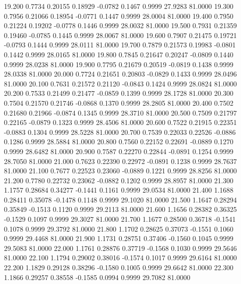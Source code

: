   19.200   0.7734   0.20155   0.18929  -0.0782   0.1467   0.9999  27.9283  81.0000
  19.300   0.7956   0.21066   0.18954  -0.0771   0.1447   0.9999  28.0004  81.0000
  19.400   0.7950   0.21224   0.19202  -0.0778   0.1446   0.9999  28.0032  81.0000
  19.500   0.7931   0.21359   0.19460  -0.0785   0.1445   0.9999  28.0067  81.0000
  19.600   0.7907   0.21475   0.19721  -0.0793   0.1444   0.9999  28.0111  81.0000
  19.700   0.7879   0.21573   0.19983  -0.0801   0.1442   0.9999  28.0165  81.0000
  19.800   0.7845   0.21647   0.20247  -0.0809   0.1440   0.9999  28.0238  81.0000
  19.900   0.7795   0.21679   0.20519  -0.0819   0.1438   0.9999  28.0338  81.0000
  20.000   0.7724   0.21651   0.20803  -0.0829   0.1433   0.9999  28.0496  81.0000
  20.100   0.7631   0.21572   0.21120  -0.0843   0.1424   0.9999  28.0824  81.0000
  20.200   0.7533   0.21499   0.21477  -0.0859   0.1399   0.9999  28.1728  81.0000
  20.300   0.7504   0.21570   0.21746  -0.0868   0.1370   0.9999  28.2805  81.0000
  20.400   0.7502   0.21680   0.21966  -0.0874   0.1345   0.9999  28.3710  81.0000
  20.500   0.7509   0.21797   0.22165  -0.0879   0.1323   0.9999  28.4506  81.0000
  20.600   0.7522   0.21915   0.22351  -0.0883   0.1304   0.9999  28.5228  81.0000
  20.700   0.7539   0.22033   0.22526  -0.0886   0.1286   0.9999  28.5884  81.0000
  20.800   0.7560   0.22152   0.22691  -0.0889   0.1270   0.9999  28.6482  81.0000
  20.900   0.7587   0.22270   0.22844  -0.0891   0.1254   0.9999  28.7050  81.0000
  21.000   0.7623   0.22390   0.22972  -0.0891   0.1238   0.9999  28.7637  81.0000
  21.100   0.7677   0.22523   0.23060  -0.0889   0.1221   0.9999  28.8256  81.0000
  21.200   0.7780   0.22732   0.23062  -0.0882   0.1202   0.9999  28.8957  81.0000
  21.300   1.1757   0.28684   0.34277  -0.1441   0.1161   0.9999  29.0534  81.0000
  21.400   1.1688   0.28411   0.35078  -0.1478   0.1148   0.9999  29.1020  81.0000
  21.500   1.1647   0.28294   0.35849  -0.1513   0.1120   0.9999  29.2113  81.0000
  21.600   1.1656   0.28382   0.36325  -0.1529   0.1097   0.9999  29.3027  81.0000
  21.700   1.1677   0.28500   0.36718  -0.1541   0.1078   0.9999  29.3792  81.0000
  21.800   1.1702   0.28625   0.37073  -0.1551   0.1060   0.9999  29.4468  81.0000
  21.900   1.1731   0.28751   0.37406  -0.1560   0.1045   0.9999  29.5083  81.0000
  22.000   1.1761   0.28876   0.37719  -0.1568   0.1030   0.9999  29.5646  81.0000
  22.100   1.1794   0.29002   0.38016  -0.1574   0.1017   0.9999  29.6164  81.0000
  22.200   1.1829   0.29128   0.38296  -0.1580   0.1005   0.9999  29.6642  81.0000
  22.300   1.1866   0.29257   0.38558  -0.1585   0.0994   0.9999  29.7082  81.0000

